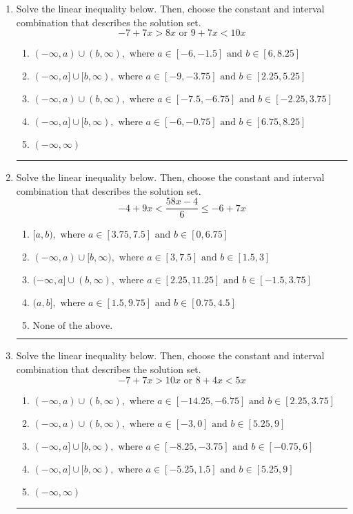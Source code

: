 \documentclass[14pt]{extbook}
\newcommand{\litem}[1]{\item#1\hspace*{-1cm}\rule{\textwidth}{0.4pt}}
\begin{document}
\begin{enumerate}
{\begin{enumerate}[label=\Alph*.]
\end{enumerate} }
\litem{
Solve the linear inequality below. Then, choose the constant and interval combination that describes the solution set.\[ -7 + 7 x > 8 x \text{ or } 9 + 7 x < 10 x \]\begin{enumerate}[label=\Alph*.]
\item \( (-\infty, a) \cup (b, \infty), \text{ where } a \in [-6, -1.5] \text{ and } b \in [6, 8.25] \)
\item \( (-\infty, a] \cup [b, \infty), \text{ where } a \in [-9, -3.75] \text{ and } b \in [2.25, 5.25] \)
\item \( (-\infty, a) \cup (b, \infty), \text{ where } a \in [-7.5, -6.75] \text{ and } b \in [-2.25, 3.75] \)
\item \( (-\infty, a] \cup [b, \infty), \text{ where } a \in [-6, -0.75] \text{ and } b \in [6.75, 8.25] \)
\item \( (-\infty, \infty) \)

\end{enumerate} }
\litem{
Solve the linear inequality below. Then, choose the constant and interval combination that describes the solution set.\[ -4 + 9 x < \frac{58 x - 4}{6} \leq -6 + 7 x \]\begin{enumerate}[label=\Alph*.]
\item \( [a, b), \text{ where } a \in [3.75, 7.5] \text{ and } b \in [0, 6.75] \)
\item \( (-\infty, a) \cup [b, \infty), \text{ where } a \in [3, 7.5] \text{ and } b \in [1.5, 3] \)
\item \( (-\infty, a] \cup (b, \infty), \text{ where } a \in [2.25, 11.25] \text{ and } b \in [-1.5, 3.75] \)
\item \( (a, b], \text{ where } a \in [1.5, 9.75] \text{ and } b \in [0.75, 4.5] \)
\item \( \text{None of the above.} \)

\end{enumerate} }
\litem{
Solve the linear inequality below. Then, choose the constant and interval combination that describes the solution set.\[ -7 + 7 x > 10 x \text{ or } 8 + 4 x < 5 x \]\begin{enumerate}[label=\Alph*.]
\item \( (-\infty, a) \cup (b, \infty), \text{ where } a \in [-14.25, -6.75] \text{ and } b \in [2.25, 3.75] \)
\item \( (-\infty, a) \cup (b, \infty), \text{ where } a \in [-3, 0] \text{ and } b \in [5.25, 9] \)
\item \( (-\infty, a] \cup [b, \infty), \text{ where } a \in [-8.25, -3.75] \text{ and } b \in [-0.75, 6] \)
\item \( (-\infty, a] \cup [b, \infty), \text{ where } a \in [-5.25, 1.5] \text{ and } b \in [5.25, 9] \)
\item \( (-\infty, \infty) \)


\end{enumerate}}
\end{enumerate}
\end{document}
